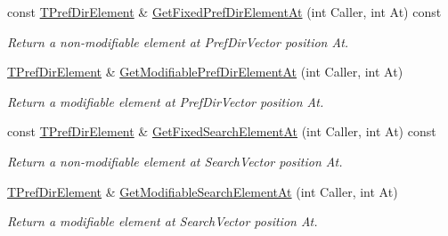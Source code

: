 \begin{DoxyCompactItemize}
\mbox{\label{class_t_one_pref_dir_a5b67e5aaa86d324229aedc68f32f32b8}} 
const \mbox{\hyperlink{class_t_pref_dir_element}{T\+Pref\+Dir\+Element}} \& \mbox{\hyperlink{class_t_one_pref_dir_a5b67e5aaa86d324229aedc68f32f32b8}{Get\+Fixed\+Pref\+Dir\+Element\+At}} (int Caller, int At) const
\begin{DoxyCompactList}\small\item\em Return a non-\/modifiable element at Pref\+Dir\+Vector position \textquotesingle{}At\textquotesingle{}. \end{DoxyCompactList}\item 
\mbox{\label{class_t_one_pref_dir_af5a2c955fa9c2584c683accbacb15f4c}} 
\mbox{\hyperlink{class_t_pref_dir_element}{T\+Pref\+Dir\+Element}} \& \mbox{\hyperlink{class_t_one_pref_dir_af5a2c955fa9c2584c683accbacb15f4c}{Get\+Modifiable\+Pref\+Dir\+Element\+At}} (int Caller, int At)
\begin{DoxyCompactList}\small\item\em Return a modifiable element at Pref\+Dir\+Vector position \textquotesingle{}At\textquotesingle{}. \end{DoxyCompactList}\item 
\mbox{\label{class_t_one_pref_dir_a11543812cef66a28f4747fb3f8f33f47}} 
const \mbox{\hyperlink{class_t_pref_dir_element}{T\+Pref\+Dir\+Element}} \& \mbox{\hyperlink{class_t_one_pref_dir_a11543812cef66a28f4747fb3f8f33f47}{Get\+Fixed\+Search\+Element\+At}} (int Caller, int At) const
\begin{DoxyCompactList}\small\item\em Return a non-\/modifiable element at Search\+Vector position \textquotesingle{}At\textquotesingle{}. \end{DoxyCompactList}\item 
\mbox{\label{class_t_one_pref_dir_a6724a8304760eb6107bddc60a269595b}} 
\mbox{\hyperlink{class_t_pref_dir_element}{T\+Pref\+Dir\+Element}} \& \mbox{\hyperlink{class_t_one_pref_dir_a6724a8304760eb6107bddc60a269595b}{Get\+Modifiable\+Search\+Element\+At}} (int Caller, int At)
\begin{DoxyCompactList}\small\item\em Return a modifiable element at Search\+Vector position \textquotesingle{}At\textquotesingle{}. \end{DoxyCompactList}\item 

\end{DoxyCompactItemize}
